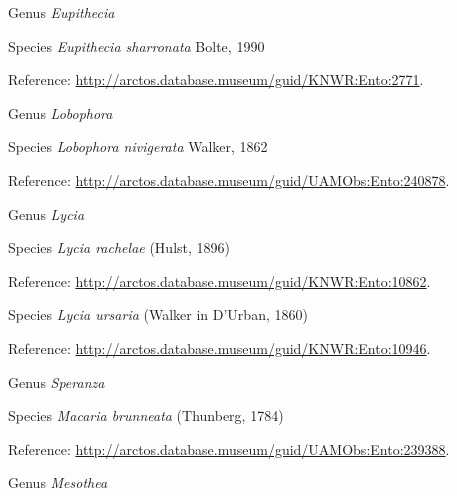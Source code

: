 \documentclass[9pt, article]{memoir}
\begin{document}
\begin{multicols}{2}
\vspace{6pt}\noindent\hspace{30pt}Genus \textit{Eupithecia}


\vspace{6pt}\noindent\hspace{36pt}Species \textit{Eupithecia sharronata} Bolte, 1990


\vspace{6pt}Reference: 
\url{http://arctos.database.museum/guid/KNWR:Ento:2771}.

\vspace{6pt}\noindent\hspace{30pt}Genus \textit{Lobophora}


\vspace{6pt}\noindent\hspace{36pt}Species \textit{Lobophora nivigerata} Walker, 1862


\vspace{6pt}Reference: 
\url{http://arctos.database.museum/guid/UAMObs:Ento:240878}.

\vspace{6pt}\noindent\hspace{30pt}Genus \textit{Lycia}


\vspace{6pt}\noindent\hspace{36pt}Species \textit{Lycia rachelae} (Hulst, 1896)


\vspace{6pt}Reference: 
\url{http://arctos.database.museum/guid/KNWR:Ento:10862}.

\vspace{6pt}\noindent\hspace{36pt}Species \textit{Lycia ursaria} (Walker in D'Urban, 1860)


\vspace{6pt}Reference: 
\url{http://arctos.database.museum/guid/KNWR:Ento:10946}.

\vspace{6pt}\noindent\hspace{30pt}Genus \textit{Speranza}


\vspace{6pt}\noindent\hspace{36pt}Species \textit{Macaria brunneata} (Thunberg, 1784)


\vspace{6pt}Reference: 
\url{http://arctos.database.museum/guid/UAMObs:Ento:239388}.

\vspace{6pt}\noindent\hspace{30pt}Genus \textit{Mesothea}



\end{multicols}
\end{document}

